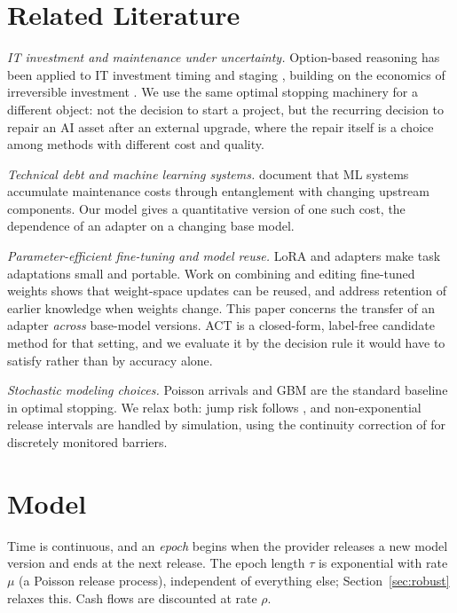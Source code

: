 \documentclass[preprint,12pt,authoryear]{elsarticle}
\begin{document}
\section{Related Literature}\label{sec:lit}

\emph{IT investment and maintenance under uncertainty.} Option-based reasoning has been applied to IT investment
timing and staging \citep{benaroch1999case,benaroch2002managing}, building on the economics of irreversible
investment \citep{mcdonald1986value,dixit1994investment}. We use the same optimal stopping machinery for a
different object: not the decision to start a project, but the recurring decision to repair an AI asset after an
external upgrade, where the repair itself is a choice among methods with different cost and quality.

\emph{Technical debt and machine learning systems.} \citet{sculley2015hidden} document that ML systems accumulate
maintenance costs through entanglement with changing upstream components. Our model gives a quantitative version of
one such cost, the dependence of an adapter on a changing base model.

\emph{Parameter-efficient fine-tuning and model reuse.} LoRA \citep{hu2022lora} and adapters \citep{houlsby2019parameter}
make task adaptations small and portable. Work on combining and editing fine-tuned weights
\citep{ilharco2023editing} shows that weight-space updates can be reused, and \citet{kirkpatrick2017overcoming}
address retention of earlier knowledge when weights change. This paper concerns the transfer of an adapter \emph{across} base-model versions. ACT is a closed-form, label-free candidate method for that setting, and we evaluate it by the decision rule it would have to satisfy rather than by accuracy alone.

\emph{Stochastic modeling choices.} Poisson arrivals and GBM are the standard baseline in optimal stopping. We relax
both: jump risk follows \citet{merton1976option}, and non-exponential release intervals are handled by simulation,
using the continuity correction of \citet{broadie1997continuity} for discretely monitored barriers.

\section{Model}\label{sec:model}

Time is continuous, and an \emph{epoch} begins when the provider releases a new model version and ends at the next
release. The epoch length $\tau$ is exponential with rate $\mu$ (a Poisson release process), independent of
everything else; Section~\ref{sec:robust} relaxes this. Cash flows are discounted at rate $\rho$.
\end{document}
